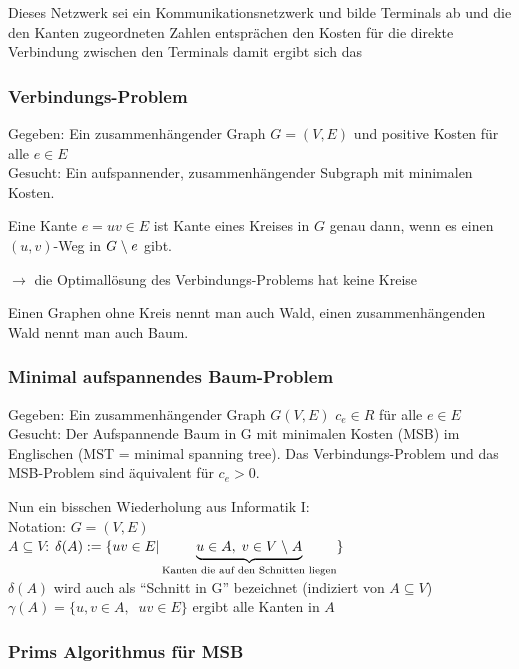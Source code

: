Dieses Netzwerk sei ein Kommunikationsnetzwerk und bilde Terminals ab und 
die den Kanten zugeordneten Zahlen entsprächen den Kosten für die direkte 
Verbindung zwischen den Terminals damit ergibt sich das

\subsubsection{Verbindungs-Problem}

Gegeben: Ein zusammenhängender Graph $G=(V,E)$ und positive Kosten für alle
$e \in E$\\
Gesucht: Ein aufspannender, zusammenhängender Subgraph mit minimalen
Kosten.

\begin{lemma}
Eine Kante $e=u v \in E$ ist Kante eines Kreises in $G$ genau dann, wenn es
einen $(u,v)$-Weg in $G \;\backslash\; e$ gibt.
\end{lemma}

$\rightarrow$ die Optimallösung des Verbindungs-Problems hat keine Kreise

Einen Graphen ohne Kreis nennt man auch Wald, einen zusammenhängenden Wald
nennt man auch Baum.

\subsubsection{Minimal aufspannendes Baum-Problem}

Gegeben: Ein zusammenhängender Graph $G(V,E)$ $c_{e} \in R$ für alle $e 
\in E$\\
Gesucht: Der Aufspannende Baum in G mit minimalen Kosten (MSB) im
Englischen (MST = minimal spanning tree). Das Verbindungs-Problem und das
MSB-Problem sind äquivalent für $c_{e} > 0$.

Nun ein bisschen Wiederholung aus Informatik I:\\
Notation: $G = (V,E)$\\
$A \subseteq V$: $\delta(A) := \{u v \in E| \underbrace{u \in A,\; v\in
V \;\backslash\; A}_{\mbox{\scriptsize Kanten die auf den Schnitten liegen}}\}$\\
$\delta(A)$ wird auch als "`Schnitt in G"' bezeichnet (indiziert von $A
\subseteq V$)\\ 
$\gamma(A) = \{u,v \in A, \; \; u v \in E\}$ ergibt alle Kanten in $A$

\subsubsection{Prims Algorithmus für MSB}

